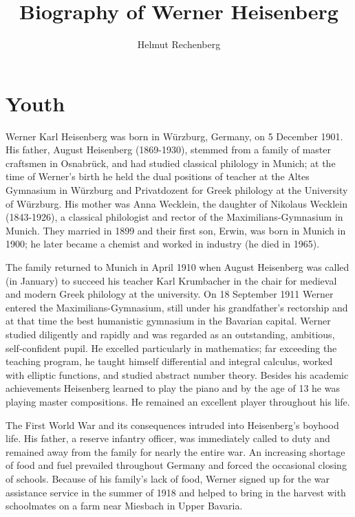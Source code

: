 \documentclass{article}
\title{Biography of Werner Heisenberg}
\author{Helmut Rechenberg}
\date{}
\begin{document}
\maketitle

\tableofcontents

\section{Youth}

Werner Karl Heisenberg was born in Würzburg, Germany, on 5 December 1901. His father, August Heisenberg (1869-1930), stemmed from a family of master craftsmen in Osnabrück, and had studied classical philology in Munich; at the time of Werner's birth he held the dual positions of teacher at the Altes Gymnasium in Würzburg and Privatdozent for Greek philology at the University of Würzburg. His mother was Anna Wecklein, the daughter of Nikolaus Wecklein (1843-1926), a classical philologist and rector of the Maximilians-Gymnasium in Munich. They married in 1899 and their first son, Erwin, was born in Munich in 1900; he later became a chemist and worked in industry (he died in 1965).

The family returned to Munich in April 1910 when August Heisenberg was called (in January) to succeed his teacher Karl Krumbacher in the chair for medieval and modern Greek philology at the university. On 18 September 1911 Werner entered the Maximilians-Gymnasium, still under his grandfather's rectorship and at that time the best humanistic gymnasium in the Bavarian capital. Werner studied diligently and rapidly and was regarded as an outstanding, ambitious, self-confident pupil. He excelled particularly in mathematics; far exceeding the teaching program, he taught himself differential and integral calculus, worked with elliptic functions, and studied abstract number theory. Besides his academic achievements Heisenberg learned to play the piano and by the age of 13 he was playing master compositions. He remained an excellent player throughout his life.

The First World War and its consequences intruded into Heisenberg's boyhood life. His father, a reserve infantry officer, was immediately called to duty and remained away from the family for nearly the entire war. An increasing shortage of food and fuel prevailed throughout Germany and forced the occasional closing of schools. Because of his family's lack of food, Werner signed up for the war assistance service in the summer of 1918 and helped to bring in the harvest with schoolmates on a farm near Miesbach in Upper Bavaria.
\end{document}
